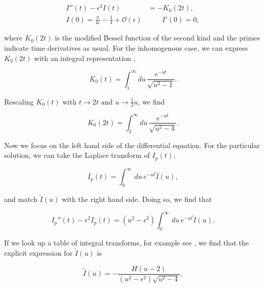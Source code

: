 \documentclass{article}
\numberwithin{equation}{section} %
\begin{document}
\begin{equation}
\begin{split}
I''(t) - \epsilon^2I(t) &= -K_0(2t),\\
I(0) = \frac{\pi}{4\epsilon} - \frac{1}{4} + \mathcal{O}(\epsilon) &\quad \quad I'(0) = 0,
\end{split}
\end{equation}

\noindent where $K_0(2t)$ is the modified Bessel function of the second kind\cite{bessel} and the primes indicate time derivatives as usual. For the inhomogenous case, we can express $K_0(2t)$ with an integral representation \cite{bessel},

%
%

\begin{equation}
K_0(t) = \int^\infty_1 du \, \frac{e^{-ut}}{\sqrt{u^2-1}}.
\end{equation}

\noindent Rescaling $K_0(t)$ with $t\rightarrow 2t\,\, \mathrm{and\,}\, u \rightarrow \frac{1}{2}u$, we find

\begin{equation}
K_0(2t) = \int^\infty_2 du \, \frac{e^{-ut}}{\sqrt{u^2-4}}.
\end{equation}

Now we focus on the left hand side of the differential equation. For the particular solution, we can take the Laplace transform of $I_p(t)$\cite{laplace},

\begin{equation}
I_p(t) = \int^\infty_0 \, du \, e^{-ut} \tilde{I}(u),
\end{equation}

\noindent and match $\tilde{I}(u)$ with the right hand side. Doing so, we find that

\begin{equation}
I_p''(t) - \epsilon^2 I_p(t) = (u^2-\epsilon^2)\int^\infty_0 \, du \, e^{-ut} \tilde{I}(u).
\end{equation}

\noindent If we look up a table of integral transforms, for example see \cite{laplace}, we find that the explicit expression for $\tilde{I}(u)$ is

\begin{equation}
\tilde{I}(u) = -\frac{H(u-2)}{(u^2-\epsilon^2)\sqrt{u^2-4}},
\end{equation}
\end{document}
